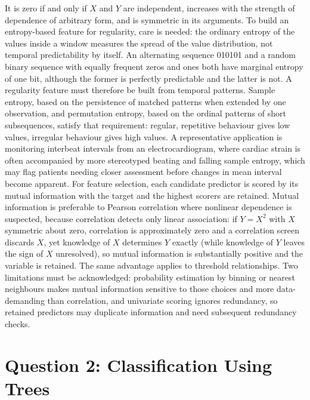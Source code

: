 \documentclass[conference]{IEEEtran}
\begin{document}
\begin{enumerate}
    It is zero if and only if $X$ and $Y$ are independent, increases with the strength of dependence of arbitrary form, and is symmetric in its arguments. To build an entropy-based feature for regularity, care is needed: the ordinary entropy of the values inside a window measures the spread of the value distribution, not temporal predictability by itself. An alternating sequence 010101 and a random binary sequence with equally frequent zeros and ones both have marginal entropy of one bit, although the former is perfectly predictable and the latter is not. A regularity feature must therefore be built from temporal patterns. Sample entropy, based on the persistence of matched patterns when extended by one observation, and permutation entropy, based on the ordinal patterns of short subsequences, satisfy that requirement: regular, repetitive behaviour gives low values, irregular behaviour gives high values. A representative application is monitoring interbeat intervals from an electrocardiogram, where cardiac strain is often accompanied by more stereotyped beating and falling sample entropy, which may flag patients needing closer assessment before changes in mean interval become apparent. For feature selection, each candidate predictor is scored by its mutual information with the target and the highest scorers are retained. Mutual information is preferable to Pearson correlation where nonlinear dependence is suspected, because correlation detects only linear association: if $Y = X^2$ with $X$ symmetric about zero, correlation is approximately zero and a correlation screen discards $X$, yet knowledge of $X$ determines $Y$ exactly (while knowledge of $Y$ leaves the sign of $X$ unresolved), so mutual information is substantially positive and the variable is retained. The same advantage applies to threshold relationships. Two limitations must be acknowledged: probability estimation by binning or nearest neighbours makes mutual information sensitive to those choices and more data-demanding than correlation, and univariate scoring ignores redundancy, so retained predictors may duplicate information and need subsequent redundancy checks.
\end{enumerate}

\section{Question 2: Classification Using Trees}
\end{document}
